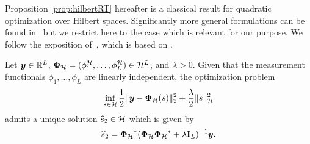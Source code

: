 \documentclass[12pt]{article}
\begin{document}
    
   Proposition \ref{prop:hilbertRT} hereafter is a classical result for quadratic optimization over Hilbert spaces. Significantly more general formulations can be found in~\cite{Scholkopf2001generalized} but we restrict here to the case which is relevant for our purpose. We follow the exposition of~\cite[Theorem~7]{caponera2021nonparametric}, which is based on \cite[Section~3.2]{Unser2020}. 

    \begin{proposition}
    \label{prop:hilbertRT}
    Let $\bm{y}\in \mathbb{R}^L$, ${\bm{\Phi}_\mathcal{H}}= (\phi^\mathcal{H}_1 ,\ldots , \phi^\mathcal{H}_L) \in \mathcal{H}^L$, and $\lambda > 0$. Given that the measurement functionals $\phi_1, \dots, \phi_L$ are linearly independent, the optimization problem 
    \begin{equation} \label{eq:hibertpb}
        \inf_{s \in \mathcal{H}} \frac{1}{2} \| \bm{y} - {\bm{\Phi}_\mathcal{H}}(s) \|_2^2 + \frac{\lambda}{2} \| s \|_{\mathcal{H}}^2
    \end{equation}
    admits a unique solution $\widehat{s}_2 \in \mathcal{H}$ which is given by
    \begin{equation} \label{eq:widehathilb}
        \widehat{s}_2  = {\bm{\Phi}_\mathcal{H}}^* ( {\bm{\Phi}_\mathcal{H}} {\bm{\Phi}_\mathcal{H}}^* + \lambda \mathbf{I}_L)^{-1} \bm{y}.
    \end{equation}
    \end{proposition}
    
\end{document}
